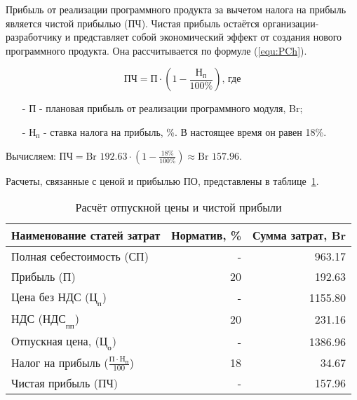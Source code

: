 Прибыль от реализации программного продукта за вычетом налога на прибыль является чистой прибылью ($\text{ПЧ}$).
Чистая прибыль остаётся организации-разработчику и представляет собой экономический эффект от создания нового программного продукта.
Она рассчитывается по формуле (\ref{equ:PCh}).

\begin{equation}
    \label{equ:PCh}
    \text{ПЧ} = \text{П} \cdot ( 1 - \frac{ \text{Н}_\text{п} }{ 100\% }) \text{, где}
\end{equation}

\begin{enumerate}
    \item[-] $\text{П}$ - плановая прибыль от реализации программного модуля, Br;
    \item[-] $\text{Н}_\text{п}$ - ставка налога на прибыль, \%. В настоящее время он равен 18\%.
\end{enumerate}

Вычисляем: $\text{ПЧ} = \text{Br }192.63 \cdot ( 1 - \frac{ 18\% }{ 100\% }) \approx \text{Br }157.96$.

Расчеты, связанные с ценой и прибылью ПО, представлены в таблице~\ref{tab:RaschetOtpusknoiCeniIChistoiPribiliPO}.

\begin{table}[ht]
    \centering

    \caption{Расчёт отпускной цены и чистой прибыли}
    \label{tab:RaschetOtpusknoiCeniIChistoiPribiliPO}

    \begin{tabular}{|l|r|r|}
        \hline
        \multicolumn{1}{|c|}{Наименование статей затрат}
        & \multicolumn{1}{c|}{Норматив, \%}
        & \multicolumn{1}{c|}{Сумма затрат, Br}
        \\ \hline

        Полная себестоимость ($\text{СП}$) & - & 963.17 \\ \hline
        Прибыль ($\text{П}$) & 20 & 192.63 \\ \hline
        Цена без НДС ($\text{Ц}_\text{п}$) & - & 1155.80 \\ \hline
        НДС ($\text{НДС}_\text{пп}$) & 20 & 231.16\\ \hline
        Отпускная цена, ($\text{Ц}_\text{о})$ & - & 1386.96 \\ \hline
        Налог на прибыль ($\frac{ \text{П} \cdot \text{H}_\text{п} }{ 100 }$) & 18 & 34.67 \\ \hline
        Чистая прибыль ($\text{ПЧ})$ & - & 157.96 \\ \hline
    \end{tabular}
\end{table}


